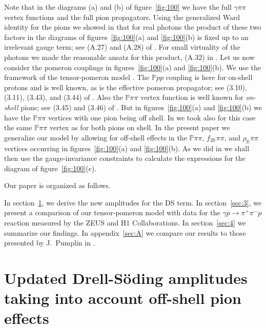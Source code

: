 \documentclass[a4paper,11pt]{article}
\newcommand{\Pom}{\mathbb{P}}
\newcommand{\Reg}{\mathbb{R}}
\begin{document}
Note that in the diagrams (a) and (b) of figure~\ref{fig:100}
we have the full $\gamma \pi \pi$ vertex functions and the full
pion propagators.
Using the generalized Ward identity for the pions
we showed in \cite{Lebiedowicz:2025xob} that for real photons
the product of these two factors in the diagrams of 
figures~\ref{fig:100}(a) and \ref{fig:100}(b) is fixed
up to an irrelevant gauge term;
see (A.27) and (A.28) of \cite{Lebiedowicz:2025xob}.
For small virtuality of the photons we made the reasonable ansatz
for this product, (A.32) in \cite{Lebiedowicz:2025xob}.
Let us now consider the pomeron couplings
in figures~\ref{fig:100}(a) and \ref{fig:100}(b).
We use the framework of the tensor-pomeron model \cite{Ewerz:2013kda}.
The $\Pom pp$ coupling is here for on-shell protons
and is well known, as is the effective pomeron propagator;
see (3.10), (3.11), (3.43), and (3.44) of \cite{Ewerz:2013kda}.
Also the $\Pom \pi \pi$ vertex function 
is well known for \textit{on-shell} pions;
see (3.45) and (3.46) of \cite{Ewerz:2013kda}.
But in figures~\ref{fig:100}(a) and \ref{fig:100}(b)
we have the $\Pom \pi \pi$ vertices with one pion being off shell.
In \cite{Lebiedowicz:2025xob} we took also for this case the same
$\Pom \pi \pi$ vertex as for both pions on shell.
In the present paper we generalize our model by allowing
for off-shell effects in the $\Pom \pi \pi$, $f_{2 \Reg} \pi \pi$,
and $\rho_{\Reg} \pi \pi$ vertices occurring in figures~\ref{fig:100}(a) and \ref{fig:100}(b).
As we did in \cite{Lebiedowicz:2025xob} we shall then use
the gauge-invariance constraints to calculate the expressions
for the diagram of figure~\ref{fig:100}(c).

Our paper is organized as follows.

In section~\ref{sec:2}, we derive the new amplitudes for the DS term.
In section~\ref{sec:3}, we present a comparison of our tensor-pomeron model
with data for the $\gamma p \to \pi^{+} \pi^{-} p$ reaction
measured by the ZEUS \cite{ZEUS:1997rof} and H1 \cite{H1:2020lzc} Collaborations.
In section~\ref{sec:4} we summarize our findings.
In appendix~\ref{sec:A} we compare our results to those presented
by J.~Pumplin in \cite{Pumplin:1970kp}.

\section{Updated Drell-S\"oding amplitudes taking into account off-shell pion effects}
\label{sec:2}
\end{document}
